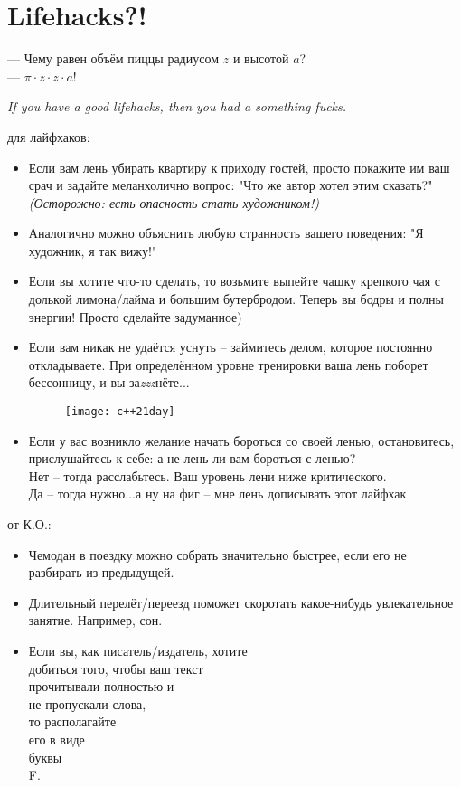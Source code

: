 \section{Lifehacks?!}
\begin{epigraph}
    --- Чему равен объём пиццы радиусом \( z \) и высотой \( a \)?\\
    --- \( \pi\cdot z\cdot z\cdot a \)!
\end{epigraph}

\noindent\emph{If you have a good lifehacks, then you had a something fucks.}

 для лайфхаков:
\begin{itemize}
    \item Если вам лень убирать квартиру к приходу гостей, просто покажите им ваш срач и задайте меланхолично вопрос: "Что же автор хотел этим сказать?" \emph{(Осторожно: есть опасность стать художником!)}
    \item Аналогично можно объяснить любую странность вашего поведения: "Я художник, я так вижу!"
    \item Если вы хотите что-то сделать, то возьмите выпейте чашку крепкого чая с долькой лимона/лайма и большим бутербродом. Теперь вы бодры и полны энергии! Просто сделайте задуманное)
    \item Если вам никак не удаётся уснуть -- займитесь делом, которое постоянно откладываете. При определённом уровне тренировки ваша лень поборет бессонницу, и вы за\emph{zzz}нёте...
    \begin{figure}[ht!]
        \centering
        \texttt{[image: c++21day]}
    \end{figure}
    \item Если у вас возникло желание начать бороться со своей ленью, остановитесь, прислушайтесь к себе: а не лень ли вам бороться с ленью?\\
        Нет -- тогда расслабьтесь. Ваш уровень лени ниже критического.\\
        Да -- тогда нужно...а ну на фиг -- мне лень дописывать этот лайфхак
\end{itemize}

\newpage

 от К.О.:
\begin{itemize}
    \item Чемодан в поездку можно собрать значительно быстрее, если его не разбирать из предыдущей.
    \item Длительный перелёт/переезд поможет скоротать какое-нибудь увлекательное занятие. Например, сон.
    \item Если вы, как писатель/издатель, хотите \\ добиться того, чтобы ваш текст \\
        прочитывали полностью и \\
        не пропускали слова, \\
        то располагайте \\
        его в виде \\
        буквы \\
        F.
\end{itemize}